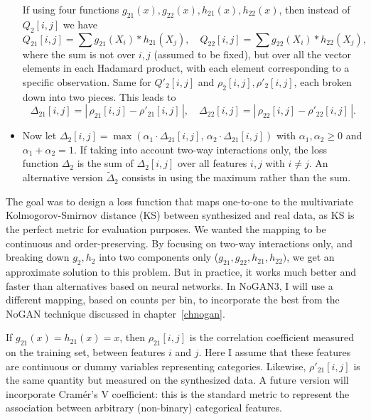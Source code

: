 \documentclass[oneside,10pt]{book}
\begin{document}
\begin{itemize}
If using four functions $g_{21}(x), g_{22}(x), h_{21}(x), h_{22}(x)$, then instead of $Q_2[i, j]$ we have %
$$Q_{21}[i,j] = \sum g_{21}(X_i) * h_{21}(X_j), \quad Q_{22}[i,j] = \sum g_{22}(X_i) * h_{22}(X_j),$$
 where the sum is not over $i, j$ (assumed to be fixed), but over all the vector elements in each Hadamard product, with each element corresponding to a specific observation.
 Same for $Q'_2[i, j]$ and $\rho_2[i,j], \rho'_2[i, j]$, each broken down into two pieces. This leads to
$$\Delta_{21}[i, j] = |\,\rho_{21}[i, j] - \rho'_{21}[i, j]\,|, \quad \Delta_{22}[i, j]=|\,\rho_{22}[i, j] - \rho'_{22}[i, j]\,|.$$
\item Now let $\Delta_2[i, j] = \max(\alpha_1 \cdot\Delta_{21}[i, j], \, \alpha_2  \cdot\Delta_{21}[i, j])$ with $\alpha_1,\alpha_2\geq 0$ and
 $\alpha_1 + \alpha_2 = 1$. If taking into account two-way interactions only, the \textcolor{index}{loss function} $\Delta_2$ is the sum of
 $\Delta_2[i, j]$ over all features $i, j$ with $i\neq j$. An alternative version $\widetilde{\Delta}_2$ consists in using the maximum rather than the sum.
\end{itemize}\vspace{1ex}

\noindent The goal was to design a loss function that maps one-to-one to the multivariate
\textcolor{index}{Kolmogorov-Smirnov distance} (KS) between synthesized and real data, as
 KS is the perfect metric for evaluation purposes. We wanted the mapping to be continuous and order-preserving. By focusing on two-way interactions only, and breaking down $g_2, h_2$ into two components only
 ($g_{21}, g_{22}, h_{21}, h_{22})$, we get an approximate solution to this problem. But in practice, it works much better and faster than alternatives based on neural networks. In NoGAN3, I will use a different mapping, based on counts per bin, to incorporate the best from the NoGAN technique discussed in chapter~\ref{chnogan}.

If $g_{21}(x) = h_{21}(x) = x$, then $\rho_{21}[i, j]$ is the correlation coefficient measured on the training set, between features $i$ and $j$.
 Here I assume that these features are continuous or
\textcolor{index}{dummy  variables} representing categories. Likewise, $\rho'_{21}[i, j]$ is the same quantity
 but measured on the synthesized data.
A future version will incorporate
\textcolor{index}{Cramér's V} coefficient: this is the standard metric to represent the association between arbitrary (non-binary)
\textcolor{index}{categorical features}.
\end{document}
